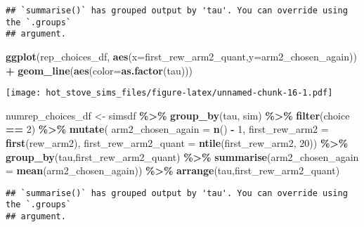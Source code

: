 \documentclass[
]{article}
\newenvironment{Shaded}{\begin{snugshade}}{\end{snugshade}}
\newcommand{\AttributeTok}[1]{\textcolor[rgb]{0.13,0.29,0.53}{#1}}
\newcommand{\DecValTok}[1]{\textcolor[rgb]{0.00,0.00,0.81}{#1}}
\newcommand{\FunctionTok}[1]{\textcolor[rgb]{0.13,0.29,0.53}{\textbf{#1}}}
\newcommand{\NormalTok}[1]{#1}
\newcommand{\OtherTok}[1]{\textcolor[rgb]{0.56,0.35,0.01}{#1}}
\newcommand{\SpecialCharTok}[1]{\textcolor[rgb]{0.81,0.36,0.00}{\textbf{#1}}}
\begin{document}
\begin{verbatim}
## `summarise()` has grouped output by 'tau'. You can override using the `.groups`
## argument.
\end{verbatim}

\begin{Shaded}
\begin{Highlighting}[]
\FunctionTok{ggplot}\NormalTok{(rep\_choices\_df, }\FunctionTok{aes}\NormalTok{(}\AttributeTok{x=}\NormalTok{first\_rew\_arm2\_quant,}\AttributeTok{y=}\NormalTok{arm2\_chosen\_again)) }\SpecialCharTok{+}
  \FunctionTok{geom\_line}\NormalTok{(}\FunctionTok{aes}\NormalTok{(}\AttributeTok{color=}\FunctionTok{as.factor}\NormalTok{(tau)))}
\end{Highlighting}
\end{Shaded}

\texttt{[image: hot\_stove\_sims\_files/figure-latex/unnamed-chunk-16-1.pdf]}

\begin{Shaded}
\begin{Highlighting}[]
\NormalTok{numrep\_choices\_df }\OtherTok{\textless{}{-}}\NormalTok{ simsdf }\SpecialCharTok{\%\textgreater{}\%}
  \FunctionTok{group\_by}\NormalTok{(tau, sim) }\SpecialCharTok{\%\textgreater{}\%}
  \FunctionTok{filter}\NormalTok{(choice }\SpecialCharTok{==} \DecValTok{2}\NormalTok{) }\SpecialCharTok{\%\textgreater{}\%}
  \FunctionTok{mutate}\NormalTok{(}
    \AttributeTok{arm2\_chosen\_again =} \FunctionTok{n}\NormalTok{() }\SpecialCharTok{{-}} \DecValTok{1}\NormalTok{,}
    \AttributeTok{first\_rew\_arm2 =} \FunctionTok{first}\NormalTok{(rew\_arm2),}
    \AttributeTok{first\_rew\_arm2\_quant =} \FunctionTok{ntile}\NormalTok{(first\_rew\_arm2, }\DecValTok{20}\NormalTok{)) }\SpecialCharTok{\%\textgreater{}\%}
  \FunctionTok{group\_by}\NormalTok{(tau,first\_rew\_arm2\_quant) }\SpecialCharTok{\%\textgreater{}\%}
  \FunctionTok{summarise}\NormalTok{(}\AttributeTok{arm2\_chosen\_again =} \FunctionTok{mean}\NormalTok{(arm2\_chosen\_again)) }\SpecialCharTok{\%\textgreater{}\%}
  \FunctionTok{arrange}\NormalTok{(tau,first\_rew\_arm2\_quant)}
\end{Highlighting}
\end{Shaded}

\begin{verbatim}
## `summarise()` has grouped output by 'tau'. You can override using the `.groups`
## argument.
\end{verbatim}
\end{document}
